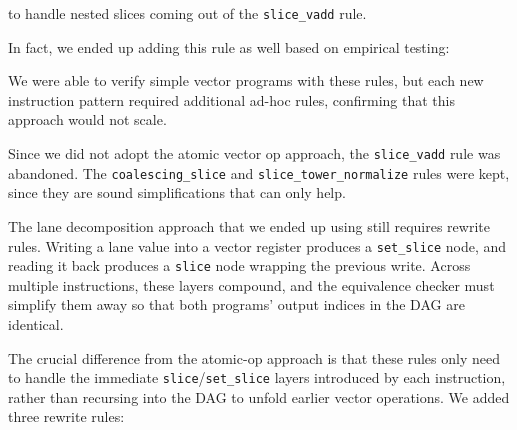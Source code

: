 to handle nested slices coming out of the \texttt{slice_vadd} rule.

In fact, we ended up adding this rule as well based on empirical testing:


We were able to verify simple vector programs with these rules, but each new instruction pattern required additional ad-hoc rules, confirming that this approach would not scale.

Since we did not adopt the atomic vector op approach, the \texttt{slice\_vadd} rule was abandoned.
The \texttt{coalescing\_slice} and \texttt{slice\_tower\_normalize} rules were kept, since they are sound simplifications that can only help.

The lane decomposition approach that we ended up using still requires rewrite rules.
Writing a lane value into a vector register produces a \texttt{set\_slice} node, and reading it back produces a \texttt{slice} node wrapping the previous write.
Across multiple instructions, these layers compound, and the equivalence checker must simplify them away so that both programs' output indices in the DAG are identical.

The crucial difference from the atomic-op approach is that these rules only need to handle the immediate \texttt{slice}/\texttt{set\_slice} layers introduced by each instruction, rather than recursing into the DAG to unfold earlier vector operations.
We added three rewrite rules:

